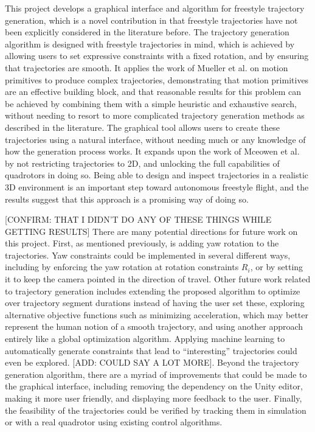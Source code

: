 \documentclass[pageno]{jpaper}
\newcommand{\quotes}[1]{``#1''}
\begin{document}
This project develops a graphical interface and algorithm for freestyle trajectory generation, which is a novel contribution in that freestyle trajectories have not been explicitly considered in the literature before. The trajectory generation algorithm is designed with freestyle trajectories in mind, which is achieved by allowing users to set expressive constraints with a fixed rotation, and by ensuring that trajectories are smooth. It applies the work of Mueller et al. on motion primitives to produce complex trajectories, demonstrating that motion primitives are an effective building block, and that reasonable results for this problem can be achieved by combining them with a simple heuristic and exhaustive search, without needing to resort to more complicated trajectory generation methods as described in the literature. The graphical tool allows users to create these trajectories using a natural interface, without needing much or any knowledge of how the generation process works. It expands upon the work of Mceowen et al. by not restricting trajectories to 2D, and unlocking the full capabilities of quadrotors in doing so. Being able to design and inspect trajectories in a realistic 3D environment is an important step toward autonomous freestyle flight, and the results suggest that this approach is a promising way of doing so.

[CONFIRM: THAT I DIDN'T DO ANY OF THESE THINGS WHILE GETTING RESULTS]
There are many potential directions for future work on this project. First, as mentioned previously, is adding yaw rotation to the trajectories. Yaw constraints could be implemented in several different ways, including by enforcing the yaw rotation at rotation constraints $R_i$, or by setting it to keep the camera pointed in the direction of travel. Other future work related to trajectory generation includes extending the proposed algorithm to optimize over trajectory segment durations instead of having the user set these, exploring alternative objective functions such as minimizing acceleration, which may better represent the human notion of a smooth trajectory, and using another approach entirely like a global optimization algorithm. Applying machine learning to automatically generate constraints that lead to \quotes{interesting} trajectories could even be explored. [ADD: COULD SAY A LOT MORE]. Beyond the trajectory generation algorithm, there are a myriad of improvements that could be made to the graphical interface, including removing the dependency on the Unity editor, making it more user friendly, and displaying more feedback to the user. Finally, the feasibility of the trajectories could be verified by tracking them in simulation or with a real quadrotor using existing control algorithms.
\end{document}
